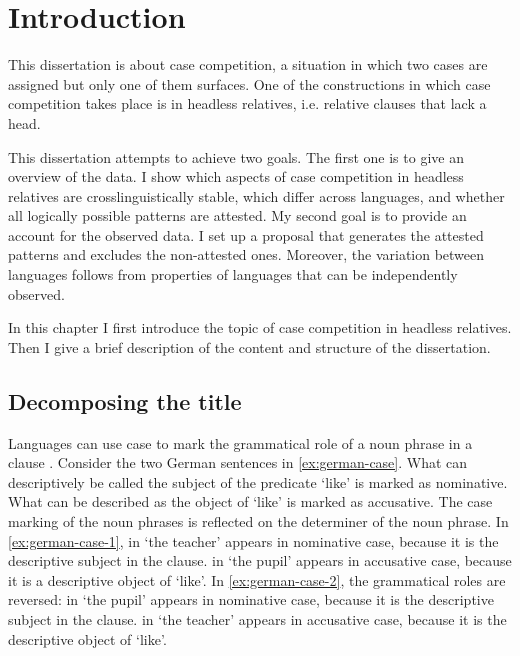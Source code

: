 
\chapter{Introduction}\label{ch:introduction}

This dissertation is about case competition, a situation in which two cases are assigned but only one of them surfaces. One of the constructions in which case competition takes place is in headless relatives, i.e. relative clauses that lack a head.

This dissertation attempts to achieve two goals. The first one is to give an overview of the data. I show which aspects of case competition in headless relatives are crosslinguistically stable, which differ across languages, and whether all logically possible patterns are attested. My second goal is to provide an account for the observed data. I set up a proposal that generates the attested patterns and excludes the non-attested ones. Moreover, the variation between languages follows from properties of languages that can be independently observed.

In this chapter I first introduce the topic of case competition in headless relatives.
Then I give a brief description of the content and structure of the dissertation.


\section{Decomposing the title}

Languages can use case to mark the grammatical role of a noun phrase in a clause \citep[cf.][]{moravcsik2009}. Consider the two German sentences in \ref{ex:german-case}. What can descriptively be called the subject of the predicate  `like' is marked as nominative. What can be described as the object of  `like' is marked as accusative. The case marking of the noun phrases is reflected on the determiner of the noun phrase.
In \ref{ex:german-case-1},  in  `the teacher' appears in nominative case, because it is the descriptive subject in the clause.  in  `the pupil' appears in accusative case, because it is a descriptive object of  `like'.
In \ref{ex:german-case-2}, the grammatical roles are reversed:  in  `the pupil' appears in nominative case, because it is the descriptive subject in the clause.  in  `the teacher' appears in accusative case, because it is the descriptive object of  `like'.

